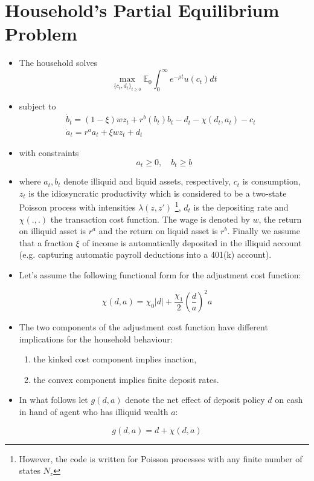 \documentclass[11pt]{article}
\begin{document}
\section{Household's Partial Equilibrium Problem}
\label{sec:org7677ad2}
\begin{itemize}
\item The household solves \[\operatorname*{max}_{\{c_t,d_{t}\}_{t\ge 0}} \mathbb{E}_0 \int_{0}^{\infty}e^{-\rho t}u(c_{t})d t\]
\item subject to \[\begin{array}{l} {\displaystyle{\dot{b}}_{t}=(1-\xi)w z_{t}+r^{b}(b_{t})b_{t}-d_{t}-\chi(d_{t},a_{t})-c_{t}}\\ {{\displaystyle{\dot{a}}_{t}=r^{a}a_{t}+\xi w z_{t}+d_{t}}}&{{}}\end{array}\]
\item with constraints \[a_{t}\geq0,\quad b_{t}\geq\underline{{{b}}}\]
\item where \(a_t, b_t\) denote illiquid and liquid assets, respectively, \(c_t\) is consumption, \(z_t\) is the idiosyncratic productivity which is considered to be a two-state Poisson process with intensities \(\lambda(z,z')\) \footnote{However, the code is written for Poisson processes with any finite number of states $N_z$}, \(d_t\) is the depositing rate and \(\chi(.,.)\) the transaction cost function. The wage is denoted by \(w\), the return on illiquid asset is \(r^a\) and the return on liquid asset is \(r^b\). Finally we assume that a fraction \(\xi\) of income is automatically deposited in the illiquid account (e.g. capturing automatic payroll deductions into a 401(k) account).
\item Let's assume the following functional form for the adjustment cost function:
\end{itemize}
\begin{equation}
\label{eq:1}
\chi(d,a)=\chi_{0}|d|+\frac{\chi_{1}}{2}\left(\frac{d}{a}\right)^{2}a
\end{equation}
\begin{itemize}
\item The two components of the adjustment cost function have different implications for the household behaviour:
\begin{enumerate}
\item the kinked cost component implies inaction,
\item the convex component implies finite deposit rates.
\end{enumerate}
\item In what follows let \(g(d,a)\) denote the net effect of deposit policy \(d\) on cash in hand of agent who has illiquid wealth \(a\):
\end{itemize}
\[g(d,a) = d + \chi(d,a) \]
\end{document}
